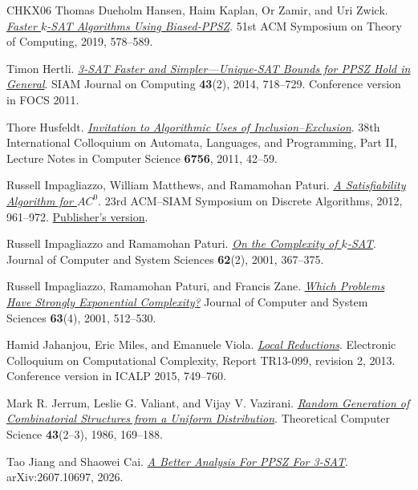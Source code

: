 \documentclass[11pt,reqno]{amsart}
\numberwithin{equation}{section}
\theoremstyle{definition}\newtheorem{definition}[theorem]{Definition}
\theoremstyle{remark}\newtheorem{remark}[theorem]{Remark}
\begin{document}
\begin{thebibliography}{CHKX06}
Thomas Dueholm Hansen, Haim Kaplan, Or Zamir, and Uri Zwick.
\href{https://doi.org/10.1145/3313276.3316359}
{\emph{Faster $k$-SAT Algorithms Using Biased-PPSZ}}.
51st ACM Symposium on Theory of Computing, 2019, 578--589.

Timon Hertli.
\href{https://doi.org/10.1137/120868177}
{\emph{3-SAT Faster and Simpler---Unique-SAT Bounds for PPSZ Hold in General}}.
SIAM Journal on Computing \textbf{43}(2), 2014, 718--729.
Conference version in FOCS 2011.

Thore Husfeldt.
\href{https://doi.org/10.1007/978-3-642-22012-8_3}
{\emph{Invitation to Algorithmic Uses of Inclusion--Exclusion}}.
38th International Colloquium on Automata, Languages, and Programming,
Part II, Lecture Notes in Computer Science \textbf{6756}, 2011, 42--59.

Russell Impagliazzo, William Matthews, and Ramamohan Paturi.
\href{https://cseweb.ucsd.edu/~paturi/myPapers/pubs/ImpagliazzoMatthewsPaturi_2012_soda.pdf}
{\emph{A Satisfiability Algorithm for $AC^0$}}.
23rd ACM--SIAM Symposium on Discrete Algorithms, 2012, 961--972.
\href{https://doi.org/10.1137/1.9781611973099.77}{Publisher's version}.

Russell Impagliazzo and Ramamohan Paturi.
\href{https://doi.org/10.1006/jcss.2000.1727}
{\emph{On the Complexity of $k$-SAT}}.
Journal of Computer and System Sciences \textbf{62}(2), 2001, 367--375.

Russell Impagliazzo, Ramamohan Paturi, and Francis Zane.
\href{https://doi.org/10.1006/jcss.2001.1774}
{\emph{Which Problems Have Strongly Exponential Complexity?}}
Journal of Computer and System Sciences \textbf{63}(4), 2001, 512--530.

Hamid Jahanjou, Eric Miles, and Emanuele Viola.
\href{https://eccc.weizmann.ac.il/report/2013/099/revision/2/download/}
{\emph{Local Reductions}}.
Electronic Colloquium on Computational Complexity, Report TR13-099,
revision 2, 2013. Conference version in ICALP 2015, 749--760.

Mark R. Jerrum, Leslie G. Valiant, and Vijay V. Vazirani.
\href{https://doi.org/10.1016/0304-3975(86)90174-X}
{\emph{Random Generation of Combinatorial Structures from a Uniform Distribution}}.
Theoretical Computer Science \textbf{43}(2--3), 1986, 169--188.

Tao Jiang and Shaowei Cai.
\href{https://arxiv.org/abs/2607.10697}
{\emph{A Better Analysis For PPSZ For 3-SAT}}.
arXiv:2607.10697, 2026.


\end{thebibliography}
\end{document}

